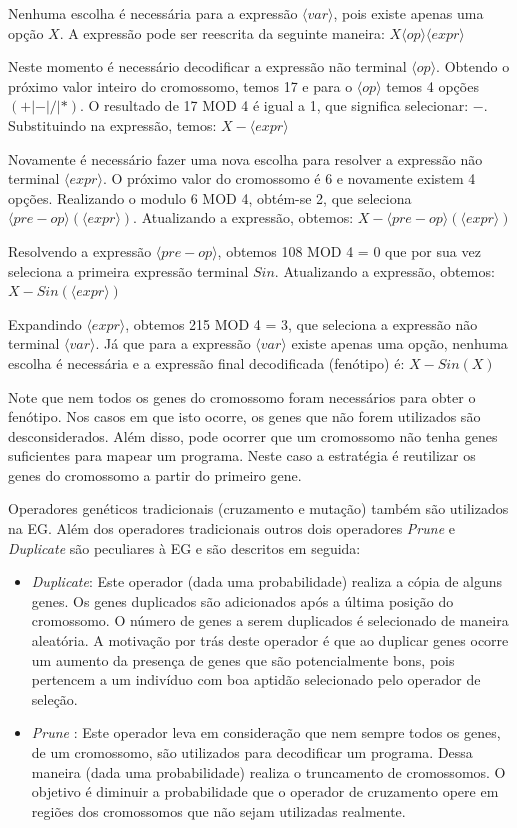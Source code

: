 Nenhuma escolha é necessária para a expressão $ \langle var \rangle$, pois existe apenas uma opção $X$. A expressão pode ser reescrita da seguinte maneira: $X \langle op \rangle \langle expr \rangle$

Neste momento é necessário decodificar a expressão não terminal $\langle op \rangle$. Obtendo o próximo valor inteiro do cromossomo, temos 17 e para o $ \langle op \rangle$ temos 4 opções $(+ | - | / | *)$. O resultado de 17 MOD 4  é igual a 1, que significa selecionar:  $-$. Substituindo na expressão, temos: $X  -  \langle expr \rangle$


Novamente é necessário fazer uma nova escolha para resolver a expressão não terminal $\langle expr \rangle$. O próximo valor do cromossomo é 6 e novamente existem 4 opções. Realizando o modulo 6 MOD 4, obtém-se 2, que seleciona $ \langle pre-op \rangle ( \langle expr \rangle)$. Atualizando a expressão, obtemos: $X - \langle pre-op \rangle (\langle expr \rangle)$

Resolvendo a expressão $ \langle pre-op \rangle$, obtemos 108 MOD 4 = 0 que por sua vez seleciona a primeira expressão  terminal $Sin$. Atualizando a expressão, obtemos: $X - Sin (\langle expr \rangle)$

Expandindo $ \langle expr \rangle$, obtemos 215 MOD 4 = 3, que seleciona a expressão não terminal $ \langle var \rangle$. Já que para a expressão $ \langle var \rangle$ existe apenas uma opção, nenhuma escolha é necessária e a expressão final decodificada (fenótipo) é: $X - Sin (X)$

Note que nem todos os genes do cromossomo foram necessários para obter o fenótipo. Nos casos em que isto ocorre, os genes que não forem utilizados são desconsiderados. Além disso, pode ocorrer que um cromossomo não tenha genes suficientes para mapear um programa. Neste caso a estratégia é reutilizar os genes do cromossomo a partir do primeiro gene. 

Operadores genéticos tradicionais (cruzamento e mutação) também são utilizados na EG. Além dos operadores tradicionais outros dois operadores \textit{Prune} e \textit{Duplicate} são peculiares à EG e são descritos em seguida:

\begin{itemize}
	\item \textit{Duplicate}: Este operador (dada uma probabilidade) realiza a cópia de  alguns genes. Os genes duplicados são adicionados após a última posição do cromossomo. O número de genes a serem duplicados é selecionado de maneira aleatória. A motivação por trás deste operador é que ao duplicar genes ocorre um aumento da presença de genes que são potencialmente bons, pois pertencem a um indivíduo com boa aptidão selecionado pelo operador de seleção.
	\item \textit{Prune} : Este operador leva em consideração que nem sempre todos os genes, de um cromossomo, são utilizados para decodificar um programa. Dessa maneira (dada uma probabilidade) realiza o truncamento de  cromossomos. O objetivo é diminuir a probabilidade que o operador de cruzamento opere em regiões dos cromossomos que não sejam utilizadas realmente.
\end{itemize}


